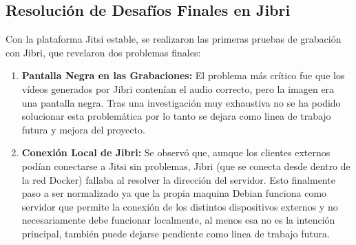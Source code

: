 \subsection{Resolución de Desafíos Finales en Jibri}
Con la plataforma Jitsi estable, se realizaron las primeras pruebas de grabación con Jibri, que revelaron dos problemas finales:
\begin{enumerate}
    \item \textbf{Pantalla Negra en las Grabaciones:} El problema más crítico fue que los vídeos generados por Jibri contenían el audio correcto, pero la imagen era una pantalla negra. Tras una investigación muy exhaustiva no se ha podido solucionar esta problemática por lo tanto se dejara como linea de trabajo futura y mejora del proyecto.
    
    \item \textbf{Conexión Local de Jibri:} Se observó que, aunque los clientes externos podían conectarse a Jitsi sin problemas, Jibri (que se conecta desde dentro de la red Docker) fallaba al resolver la dirección del servidor. Esto finalmente paso a ser normalizado ya que la propia maquina Debian funciona como servidor que permite la conexión de los distintos dispositivos externos y no necesariamente debe funcionar localmente, al menos esa no es la intención principal, también puede dejarse pendiente como linea de trabajo futura.
\end{enumerate}


